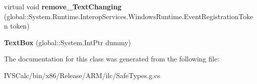 \begin{DoxyCompactItemize}
\item 
\mbox{\label{class_windows_1_1_u_i_1_1_xaml_1_1_controls_1_1_text_box_aacef19be208dde1a5d0585bc1113f0bd}} 
virtual void {\bfseries remove\+\_\+\+Text\+Changing} (global\+::\+System.\+Runtime.\+Interop\+Services.\+Windows\+Runtime.\+Event\+Registration\+Token token)
\item 
\mbox{\label{class_windows_1_1_u_i_1_1_xaml_1_1_controls_1_1_text_box_adcfa94babf525333e555cfc9f2b34314}} 
{\bfseries Text\+Box} (global\+::\+System.\+Int\+Ptr dummy)
\end{DoxyCompactItemize}


The documentation for this class was generated from the following file\+:\begin{DoxyCompactItemize}
\item 
I\+V\+S\+Calc/bin/x86/\+Release/\+A\+R\+M/ilc/Safe\+Types.\+g.\+cs\end{DoxyCompactItemize}
